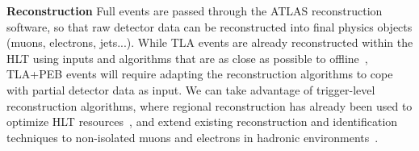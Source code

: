 \textbf{Reconstruction} Full events are passed through the ATLAS reconstruction software, so that raw detector data can be reconstructed into final physics objects (muons, electrons, jets...). 
While TLA events are already reconstructed within the HLT using inputs and algorithms that are as close as possible to offline~\cite{Aaboud:2017aca,PERF-2017-01,EGAM-2018-01,EGAM-2018-01,Aad:2016jkr}, 
TLA+PEB events will require adapting the reconstruction algorithms to cope with partial detector data as input. 
We can take advantage of trigger-level reconstruction algorithms, where regional reconstruction has already been used to optimize HLT resources~\cite{Aaboud:2016leb}, %
and extend existing reconstruction and identification techniques to non-isolated muons and electrons in hadronic environments~\cite{Chatterjee:2019brg,Aaboud:2019wfg}. %

